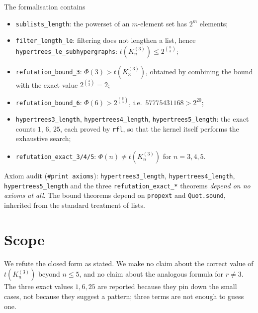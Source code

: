 \documentclass[11pt]{article}
\theoremstyle{remark}
\begin{document}
The formalisation contains
\begin{itemize}
\item \texttt{sublists\_length}: the powerset of an $m$-element set has $2^m$
elements;
\item \texttt{filter\_length\_le}: filtering does not lengthen a list, hence
\texttt{hypertrees\_le\_subhypergraphs}: $t(K_n^{(3)}) \le 2^{\binom{n}{3}}$;
\item \texttt{refutation\_bound\_3}: $\Phi(3) > t(K_3^{(3)})$, obtained by
combining the bound with the exact value $2^{\binom{3}{3}} = 2$;
\item \texttt{refutation\_bound\_6}: $\Phi(6) > 2^{\binom{6}{3}}$, i.e.\
$57775431168 > 2^{20}$;
\item \texttt{hypertrees3\_length}, \texttt{hypertrees4\_length},
\texttt{hypertrees5\_length}: the exact counts $1$, $6$, $25$, each proved by
\texttt{rfl}, so that the kernel itself performs the exhaustive search;
\item \texttt{refutation\_exact\_3/4/5}: $\Phi(n) \ne t(K_n^{(3)})$ for
$n = 3,4,5$.
\end{itemize}

Axiom audit (\texttt{\#print axioms}): \texttt{hypertrees3\_length},
\texttt{hypertrees4\_length}, \texttt{hypertrees5\_length} and the three
\texttt{refutation\_exact\_*} theorems \emph{depend on no axioms at all}. The
bound theorems depend on \texttt{propext} and \texttt{Quot.sound}, inherited
from the standard treatment of lists.

\section{Scope}

We refute the closed form as stated. We make no claim about the correct value of
$t(K_n^{(3)})$ beyond $n \le 5$, and no claim about the analogous formula for
$r \ne 3$. The three exact values $1, 6, 25$ are reported because they pin down
the small cases, not because they suggest a pattern; three terms are not enough
to guess one.
\end{document}
